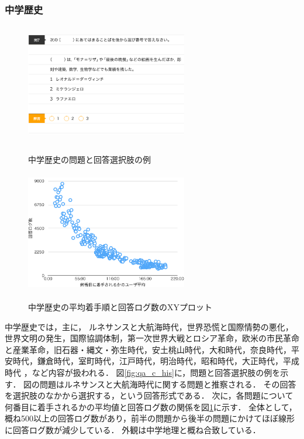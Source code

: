 \subsubsection{中学歴史}
\begin{figure}[ht]
\begin{center}
	\includegraphics[width=200pt, height=150pt]{./img/qa_c_his.png}
	\caption{中学歴史の問題と回答選択肢の例}
	\label{fig:qa_c_his}
\endminipage\hfill
{}
	\includegraphics[width=200pt, height=150pt]{./img/stats_c_his.pdf}
	\caption{中学歴史の平均着手順と回答ログ数のXYプロット}
	\label{fig:stats_c_his}
\endminipage\hfill
\end{center}
\end{figure}
中学歴史では，主に，
ルネサンスと大航海時代，世界恐慌と国際情勢の悪化，世界文明の発生，国際協調体制，第一次世界大戦とロシア革命，欧米の市民革命と産業革命，旧石器・縄文・弥生時代，安土桃山時代，大和時代，奈良時代，平安時代，鎌倉時代，室町時代，江戸時代，明治時代，昭和時代，大正時代，平成時代
，など内容が扱われる．
図\ref{fig:qa_c_his}に，問題と回答選択肢の例を示す．
図の問題はルネサンスと大航海時代に関する問題と推察される．
その回答を選択肢のなかから選択する，という回答形式である．
次に，各問題について何番目に着手されるかの平均値と回答ログ数の関係を図\ref{fig:stats_c_his}に示す．
全体として，概ね500以上の回答ログ数があり，前半の問題から後半の問題にかけてほぼ線形に回答ログ数が減少している．
外観は中学地理と概ね合致している．


